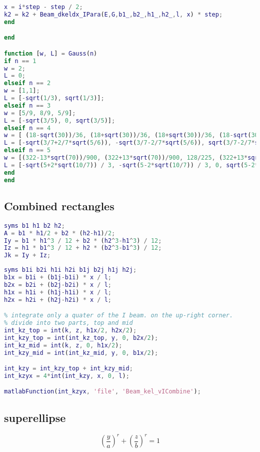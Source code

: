 \begin{lstlisting}[language = matlab]
x = i*step - step / 2;
k2 = k2 + Beam_dkeldx_IPara(E,G,b1_,b2_,h1_,h2_,l, x) * step;
end

end

function [w, L] = Gauss(n)
if n == 1
w = 2;
L = 0;
elseif n == 2
w = [1,1];
L = [-sqrt(1/3), sqrt(1/3)];
elseif n == 3
w = [5/9, 8/9, 5/9];
L = [-sqrt(3/5), 0, sqrt(3/5)];
elseif n == 4
w = [ (18-sqrt(30))/36, (18+sqrt(30))/36, (18+sqrt(30))/36, (18-sqrt(30))/36];
L = [-sqrt(3/7+2/7*sqrt(5/6)), -sqrt(3/7-2/7*sqrt(5/6)), sqrt(3/7-2/7*sqrt(5/6)), sqrt(3/7+2/7*sqrt(5/6))];
elseif n == 5
w = [(322-13*sqrt(70))/900, (322+13*sqrt(70))/900, 128/225, (322+13*sqrt(70))/900, (322-13*sqrt(70))/900];
L = [-sqrt(5+2*sqrt(10/7)) / 3, -sqrt(5-2*sqrt(10/7)) / 3, 0, sqrt(5-2*sqrt(10/7)) / 3, sqrt(5+2*sqrt(10/7)) / 3];
end
end
\end{lstlisting}

\subsection{Combined rectangles}
\begin{lstlisting}[language = matlab]
% ---- cICombine ----------------------------------------------------------
syms b1 h1 b2 h2;
A = b1 * h1/2 + b2 * (h2-h1)/2;
Iy = b1 * h1^3 / 12 + b2 * (h2^3-h1^3) / 12;
Iz = h1 * b1^3 / 12 + h2 * (b2^3-b1^3) / 12;
Jk = Iy + Iz;
\end{lstlisting}

\begin{lstlisting}[language = matlab]
% ---- vICombine ----------------------------------------------------------
syms b1i b2i h1i h2i b1j b2j h1j h2j;
b1x = b1i + (b1j-b1i) * x / l;
b2x = b2i + (b2j-b2i) * x / l;
h1x = h1i + (h1j-h1i) * x / l;
h2x = h2i + (h2j-h2i) * x / l;

% integrate only a quater of the I beam. on the up-right corner.
% divide into two parts, top and mid
int_kz_top = int(k, z, h1x/2, h2x/2);
int_kzy_top = int(int_kz_top, y, 0, b2x/2);
int_kz_mid = int(k, z, 0, h1x/2);
int_kzy_mid = int(int_kz_mid, y, 0, b1x/2);

int_kzy = int_kzy_top + int_kzy_mid;
int_kzyx = 4*int(int_kzy, x, 0, l);

matlabFunction(int_kzyx, 'file', 'Beam_kel_vICombine');
\end{lstlisting}

\subsection{superellipse}
\begin{equation}\label{key}
(\dfrac{y}{a})^r + (\dfrac{z}{b}) ^ r = 1
\end{equation}

